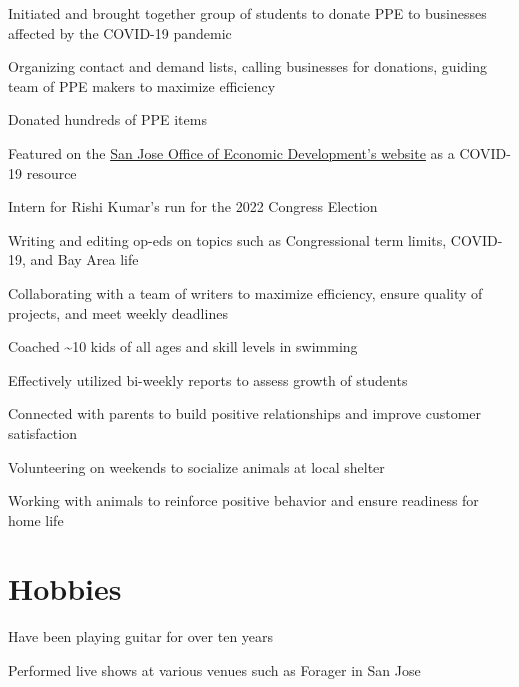 \documentclass[letterpaper]{resume-shreeram}
\begin{document}
\begin{compactitem}
    \item Initiated and brought together group of students to donate PPE to businesses affected by the COVID-19 pandemic
    \item Organizing contact and demand lists, calling businesses for donations, guiding team of PPE makers to maximize efficiency
    \item Donated hundreds of PPE items
    \item Featured on the \href{https://www.sjeconomy.com/why-san-jose/covid-19-guidance/local-suppliers}{San Jose Office of Economic Development's website} as a COVID-19 resource
\end{compactitem}

\begin{compactitem}
    \item Intern for Rishi Kumar's run for the 2022 Congress Election
    \item Writing and editing op-eds on topics such as Congressional term limits, COVID-19, and Bay Area life
    \item Collaborating with a team of writers to maximize efficiency, ensure quality of projects, and meet weekly deadlines
\end{compactitem}

\begin{compactitem}
    \item Coached \textasciitilde{}10 kids of all ages and skill levels in swimming
    \item Effectively utilized bi-weekly reports to assess growth of students
    \item Connected with parents to build positive relationships and improve customer satisfaction
\end{compactitem}

\begin{compactitem}
  \item Volunteering on weekends to socialize animals at local shelter
  \item Working with animals to reinforce positive behavior and ensure readiness for home life
\end{compactitem}


\section{Hobbies}

\begin{compactitem}
  \item Have been playing guitar for over ten years
  \item Performed live shows at various venues such as Forager in San Jose
\end{compactitem}
\end{document}
